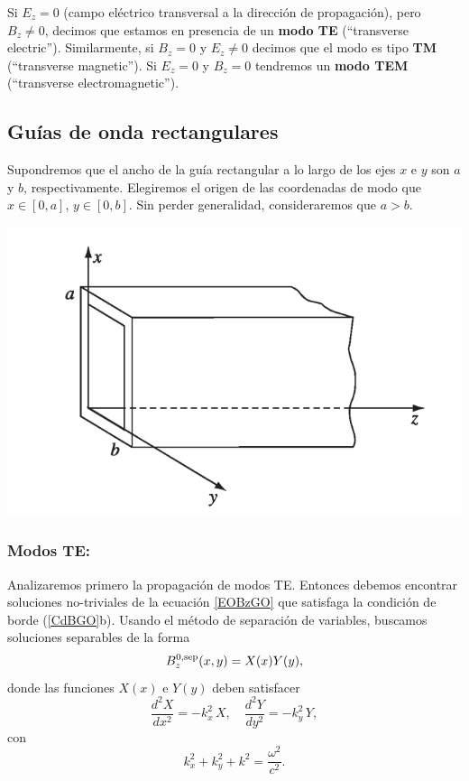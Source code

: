 Si $E_z=0$ (campo eléctrico transversal a la dirección de propagación), pero $B_z\neq 0$, decimos que estamos en presencia de un \textbf{modo TE} (``transverse electric''). Similarmente, si $B_z=0$ y $E_z\neq 0$ decimos que el modo es tipo \textbf{TM} (``transverse magnetic''). Si $E_z=0$ y $B_z= 0$ tendremos un \textbf{modo TEM} (``transverse electromagnetic''). 


\subsection{Guías de onda rectangulares}
Supondremos que el ancho de la guía rectangular a lo largo de los ejes $x$ e $y$ son $a$ y $b$, respectivamente. Elegiremos el origen de las coordenadas de modo que $x\in [0,a]$, $y\in [0,b]$. Sin perder generalidad, consideraremos que $a>b$.

\begin{center}
\includegraphics[scale=0.4]{fig/fig-guia-onda-rectangular.png}
\end{center}

\subsubsection{Modos TE:} Analizaremos primero la propagación de modos TE. Entonces debemos encontrar soluciones no-triviales de la ecuación \eqref{EOBzGO} que satisfaga la condición de borde (\ref{CdBGO}b). Usando el método de separación de variables, buscamos soluciones separables de la forma
\begin{equation}
B_z^{0,\rm sep}(x, y) = X(x) Y(y),
\end{equation}
donde las funciones $X(x)$ e $Y(y)$ deben satisfacer
\begin{equation}
\frac{d^2 X}{dx^2} = -k_x^2\,X, \quad \frac{d^2 Y}{dy^2} = -k_y^2\,Y,
\end{equation}
con
\begin{equation}\label{RelDispGOR}
k_x^2 + k_y^2  +k^2 = \frac{\omega^2}{c^2}.
\end{equation} 

